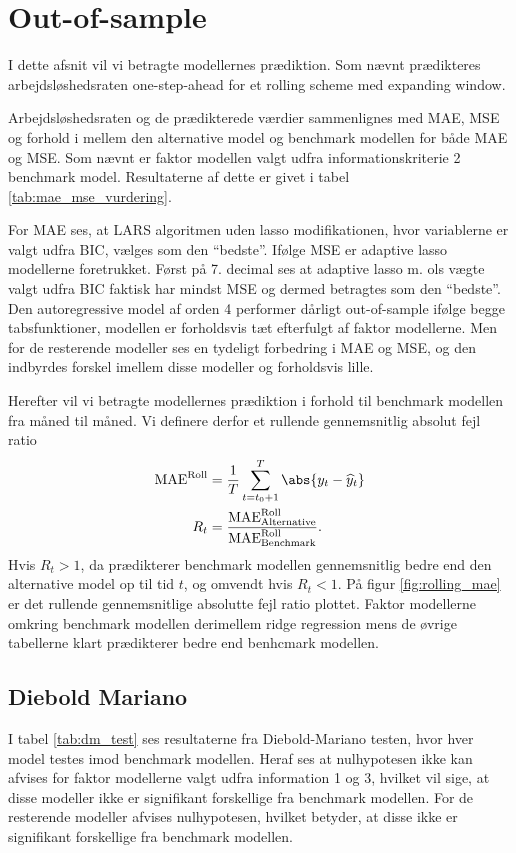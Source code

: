 \section{Out-of-sample}
I dette afsnit vil vi betragte modellernes prædiktion.
Som nævnt prædikteres arbejdsløshedsraten one-step-ahead for et rolling scheme med expanding window.

Arbejdsløshedsraten og de prædikterede værdier sammenlignes med MAE, MSE og forhold i mellem den alternative model og benchmark modellen for både MAE og MSE.
Som nævnt er faktor modellen valgt udfra informationskriterie 2 benchmark model.
Resultaterne af dette er givet i tabel \ref{tab:mae_mse_vurdering}.
%


For MAE ses, at LARS algoritmen uden lasso modifikationen, hvor variablerne er valgt udfra BIC, vælges som den ``bedste''.
Ifølge MSE er adaptive lasso modellerne foretrukket.
Først på 7. decimal ses at adaptive lasso m. ols vægte valgt udfra BIC faktisk har mindst MSE og dermed betragtes som den ``bedste''.
Den autoregressive model af orden 4 performer dårligt out-of-sample ifølge begge tabsfunktioner, modellen er forholdsvis tæt efterfulgt af faktor modellerne.
Men for de resterende modeller ses en tydeligt forbedring i MAE og MSE, og den indbyrdes forskel imellem disse modeller og forholdsvis lille.

Herefter vil vi betragte modellernes prædiktion i forhold til benchmark modellen fra måned til måned.
Vi definere derfor et rullende gennemsnitlig absolut fejl ratio 
\begin{align*}
\text{MAE}^\text{Roll} &= \frac{1}{T} \sum_{t = t_0 +1}^{T} \abs{y_t - \widehat{y}_t} \\
R_t &= \frac{\text{MAE}_\text{Alternative}^\text{Roll}}{\text{MAE}_\text{Benchmark}^\text{Roll}}.
\end{align*}
Hvis \(R_t > 1\), da prædikterer benchmark modellen gennemsnitlig bedre end den alternative model op til tid \(t\), og omvendt hvis \(R_t < 1\).
På figur \ref{fig:rolling_mae} er det rullende gennemsnitlige absolutte fejl ratio plottet.
Faktor modellerne omkring benchmark modellen
derimellem ridge regression
mens de øvrige tabellerne klart prædikterer bedre end benhcmark modellen.
%
%
\subsection{Diebold Mariano}
I tabel \ref{tab:dm_test} ses resultaterne fra Diebold-Mariano testen, hvor hver model testes imod benchmark modellen.
Heraf ses at nulhypotesen ikke kan afvises for faktor modellerne valgt udfra information 1 og 3, hvilket vil sige, at disse modeller ikke er signifikant forskellige fra benchmark modellen.
For de resterende modeller afvises nulhypotesen, hvilket betyder, at disse ikke er signifikant forskellige fra benchmark modellen.
%

%
\newpage
